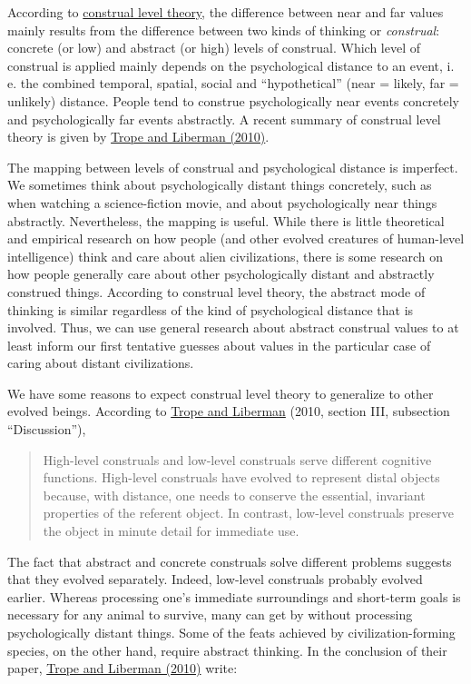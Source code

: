 According to
\href{https://en.wikipedia.org/wiki/Construal_level_theory}{construal
level theory}, the difference between near and far values mainly
results from the difference between two kinds of thinking or
\emph{construal}: concrete (or low) and abstract (or high) levels of
construal. Which level of construal is applied mainly depends on the
psychological distance to an event, i.\,e. the combined temporal, spatial,
social and ``hypothetical'' (near = likely, far = unlikely) distance.
People tend to construe psychologically near events concretely and
psychologically far events abstractly. A recent summary of construal
level theory is given by
\href{http://www.psych.nyu.edu/trope/Trope_Liberman_2010.pdf}{Trope
and Liberman (2010)}.

The mapping between levels of construal and psychological distance is
imperfect. We sometimes think about psychologically distant things
concretely, such as when watching a science-fiction movie, and about
psychologically near things abstractly. Nevertheless, the mapping is
useful. While there is little theoretical and empirical research on how
people (and other evolved creatures of human-level intelligence) think
and care about alien civilizations, there is some research on how people
generally care about other psychologically distant and abstractly
construed things. According to construal level theory, the abstract mode
of thinking is similar regardless of the kind of psychological distance
that is involved. Thus, we can use general research about abstract
construal values to at least inform our first tentative guesses about
values in the particular case of caring about distant civilizations.

We have some reasons to expect construal level theory to generalize to
other evolved beings. According to
\href{http://www.psych.nyu.edu/trope/Trope_Liberman_2010.pdf}{Trope and Liberman} (2010, section
III, subsection ``Discussion''),

\begin{quote}
High-level construals and low-level construals serve different cognitive
functions. High-level construals have evolved to represent distal
objects because, with distance, one needs to conserve the essential,
invariant properties of the referent object. In contrast, low-level
construals preserve the object in minute detail for immediate use.
\end{quote}

The fact that abstract and concrete construals solve different problems
suggests that they evolved separately. Indeed, low-level construals
probably evolved earlier. Whereas processing one's immediate
surroundings and short-term goals is necessary for any animal to
survive, many can get by without processing psychologically distant
things. Some of the feats achieved by civilization-forming species, on
the other hand, require abstract thinking. In the conclusion of their
paper, \href{http://www.psych.nyu.edu/trope/Trope_Liberman_2010.pdf}{Trope and Liberman (2010)} write:

